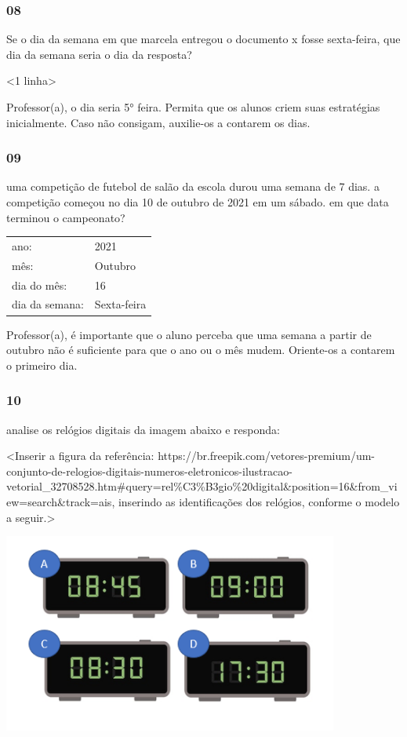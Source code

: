 \subsubsection{08}\label{section-46}

Se o dia da semana em que marcela entregou o documento x fosse
sexta-feira, que dia da semana seria o dia da resposta?

\textless{}1 linha\textgreater{}

Professor(a), o dia seria 5° feira. Permita que os alunos criem suas
estratégias inicialmente. Caso não consigam, auxilie-os a contarem os
dias.

\subsubsection{09}\label{section-47}

uma competição de futebol de salão da escola durou uma semana de 7 dias.
a competição começou no dia 10 de outubro de 2021 em um sábado. em que
data terminou o campeonato?

\begin{longtable}[]{@{}ll@{}}
\toprule
ano: & 2021\tabularnewline
mês: & Outubro\tabularnewline
dia do mês: & 16\tabularnewline
dia da semana: & Sexta-feira\tabularnewline
\bottomrule
\end{longtable}

Professor(a), é importante que o aluno perceba que uma semana a partir
de outubro não é suficiente para que o ano ou o mês mudem. Oriente-os a
contarem o primeiro dia.

\subsubsection{10}\label{section-48}

analise os relógios digitais da imagem abaixo e responda:

\textless{}Inserir a figura da referência:
https://br.freepik.com/vetores-premium/um-conjunto-de-relogios-digitais-numeros-eletronicos-ilustracao-vetorial\_32708528.htm\#query=rel\%C3\%B3gio\%20digital\&position=16\&from\_view=search\&track=ais,
inserindo as identificações dos relógios, conforme o modelo a
seguir.\textgreater{}

\includegraphics[width=4.34174in,height=2.58209in]{media/image38.png}

